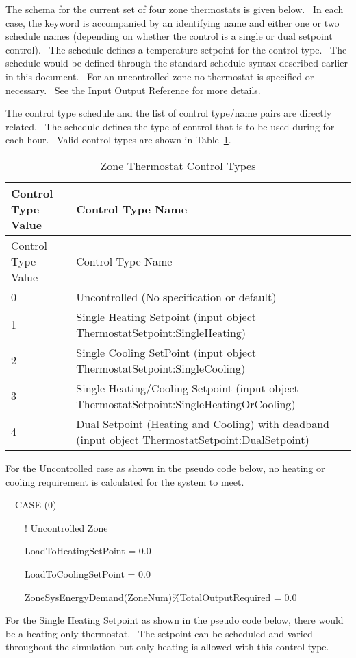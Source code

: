 The schema for the current set of four zone thermostats is given below.~ In each case, the keyword is accompanied by an identifying name and either one or two schedule names (depending on whether the control is a single or dual setpoint control).~ The schedule defines a temperature setpoint for the control type.~ The schedule would be defined through the standard schedule syntax described earlier in this document.~ For an uncontrolled zone no thermostat is specified or necessary.~ See the Input Output Reference for more details.

The control type schedule and the list of control type/name pairs are directly related.~ The schedule defines the type of control that is to be used during for each hour.~ Valid control types are shown in Table~\ref{table:zone-thermostat-control-types}.

\begin{longtable}[c]{p{1.5in}p{4.5in}}
\caption{Zone Thermostat Control Types \label{table:zone-thermostat-control-types}} \tabularnewline
\toprule 
Control Type Value & Control Type Name \tabularnewline
\midrule
\endfirsthead

\toprule 
Control Type Value & Control Type Name \tabularnewline
\midrule
\endhead

0 & Uncontrolled (No specification or default) \tabularnewline
1 & Single Heating Setpoint (input object ThermostatSetpoint:SingleHeating) \tabularnewline
2 & Single Cooling SetPoint (input object ThermostatSetpoint:SingleCooling) \tabularnewline
3 & Single Heating/Cooling Setpoint (input object ThermostatSetpoint:SingleHeatingOrCooling) \tabularnewline
4 & Dual Setpoint (Heating and Cooling) with deadband (input object ThermostatSetpoint:DualSetpoint) \tabularnewline
\bottomrule
\end{longtable}

For the Uncontrolled case as shown in the pseudo code below, no heating or cooling requirement is calculated for the system to meet.

~~CASE (0)

~~~~! Uncontrolled Zone

~~~~LoadToHeatingSetPoint = 0.0

~~~~LoadToCoolingSetPoint = 0.0

~~~~ZoneSysEnergyDemand(ZoneNum)\%TotalOutputRequired = 0.0

For the Single Heating Setpoint as shown in the pseudo code below, there would be a heating only thermostat.~ The setpoint can be scheduled and varied throughout the simulation but only heating is allowed with this control type.

